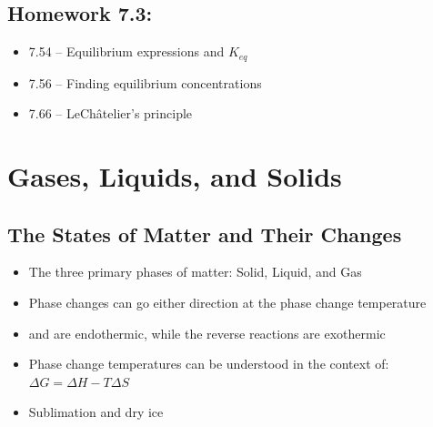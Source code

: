 \documentclass[12pt, openany, letterpaper]{memoir}
\begin{document}
\section*{Homework 7.3:}
\begin{itemize}
	\item 7.54 -- Equilibrium expressions and $K_{eq}$
	\item 7.56 -- Finding equilibrium concentrations
	\item 7.66 -- LeCh\^atelier's principle
\end{itemize}

\chapter{Gases, Liquids, and Solids}
\section{The States of Matter and Their Changes}
\begin{itemize}
	\item The three primary phases of matter: Solid, Liquid, and Gas
	\item Phase changes can go either direction at the phase change temperature
	\item {} and  are endothermic, while the reverse reactions are exothermic
	\item Phase change temperatures can be understood in the context of: $\Delta G = \Delta H - T\Delta S$
	\item Sublimation and dry ice
\end{itemize}
\end{document}
